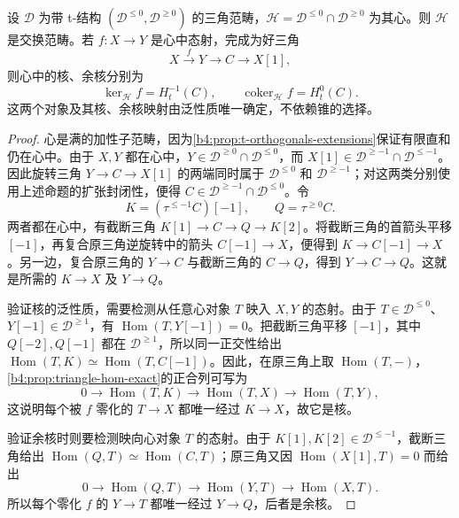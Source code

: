 \begin{theorem}\label{b4:thm:heart-abelian}
	设 \(\mathcal D\) 为带 t-结构 \((\mathcal D^{\le0},\mathcal D^{\ge0})\) 的三角范畴，\(\mathcal H=\mathcal D^{\le0}\cap\mathcal D^{\ge0}\) 为其心。则 \(\mathcal H\) 是交换范畴。若 \(f:X\to Y\) 是心中态射，完成为好三角
	\[
		X\xrightarrow{f}Y\longrightarrow C\longrightarrow X[1],
	\]
	则心中的核、余核分别为
	\[
		\ker_{\mathcal H}f=H_t^{-1}(C),\qquad \operatorname{coker}_{\mathcal H}f=H_t^0(C).
	\]
	这两个对象及其核、余核映射由泛性质唯一确定，不依赖锥的选择。
\end{theorem}
\begin{proof}
	心是满的加性子范畴，因为\cref{b4:prop:t-orthogonals-extensions}保证有限直和仍在心中。由于 \(X,Y\) 都在心中，\(Y\in\mathcal D^{\ge0}\cap\mathcal D^{\le0}\)，而 \(X[1]\in\mathcal D^{\ge-1}\cap\mathcal D^{\le-1}\)。因此旋转三角 \(Y\to C\to X[1]\) 的两端同时属于 \(\mathcal D^{\le0}\) 和 \(\mathcal D^{\ge-1}\)；对这两类分别使用上述命题的扩张封闭性，便得 \(C\in\mathcal D^{\ge-1}\cap\mathcal D^{\le0}\)。令
	\[
		K=(\tau^{\le-1}C)[-1],\qquad Q=\tau^{\ge0}C.
	\]
	两者都在心中，有截断三角 \(K[1]\to C\to Q\to K[2]\)。将截断三角的首箭头平移 \([-1]\)，再复合原三角逆旋转中的箭头 \(C[-1]\to X\)，便得到 \(K\to C[-1]\to X\)。另一边，复合原三角的 \(Y\to C\) 与截断三角的 \(C\to Q\)，得到 \(Y\to C\to Q\)。这就是所需的 \(K\to X\) 及 \(Y\to Q\)。

	验证核的泛性质，需要检测从任意心对象 \(T\) 映入 \(X,Y\) 的态射。由于 \(T\in\mathcal D^{\le0}\)、\(Y[-1]\in\mathcal D^{\ge1}\)，有 \(\operatorname{Hom}(T,Y[-1])=0\)。把截断三角平移 \([-1]\)，其中 \(Q[-2],Q[-1]\) 都在 \(\mathcal D^{\ge1}\)，所以同一正交性给出 \(\operatorname{Hom}(T,K)\simeq\operatorname{Hom}(T,C[-1])\)。因此，在原三角上取 \(\operatorname{Hom}(T,-)\)，\cref{b4:prop:triangle-hom-exact}的正合列可写为
	\[
		0\longrightarrow\operatorname{Hom}(T,K) \longrightarrow\operatorname{Hom}(T,X) \longrightarrow\operatorname{Hom}(T,Y),
	\]
	这说明每个被 \(f\) 零化的 \(T\to X\) 都唯一经过 \(K\to X\)，故它是核。

	验证余核时则要检测映向心对象 \(T\) 的态射。由于 \(K[1],K[2]\in\mathcal D^{\le-1}\)，截断三角给出 \(\operatorname{Hom}(Q,T)\simeq\operatorname{Hom}(C,T)\)；原三角又因 \(\operatorname{Hom}(X[1],T)=0\) 而给出
	\[
		0\longrightarrow\operatorname{Hom}(Q,T) \longrightarrow\operatorname{Hom}(Y,T) \longrightarrow\operatorname{Hom}(X,T).
	\]
	所以每个零化 \(f\) 的 \(Y\to T\) 都唯一经过 \(Y\to Q\)，后者是余核。


\end{proof}
